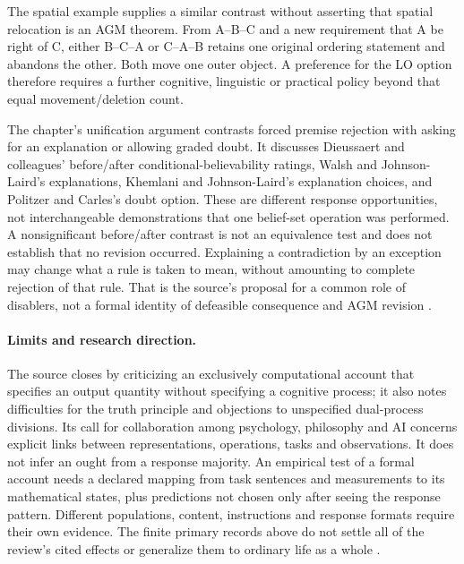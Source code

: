 The spatial example supplies a similar contrast without asserting that
spatial relocation is an AGM theorem. From A--B--C and a new requirement
that A be right of C, either B--C--A or C--A--B retains one original
ordering statement and abandons the other. Both move one outer object.
A preference for the LO option therefore requires a further cognitive,
linguistic or practical policy beyond that equal movement/deletion count.

The chapter's unification argument contrasts forced premise rejection
with asking for an explanation or allowing graded doubt. It discusses
Dieussaert and colleagues' before/after conditional-believability ratings,
Walsh and Johnson-Laird's explanations, Khemlani and Johnson-Laird's
explanation choices, and Politzer and Carles's doubt option. These are
different response opportunities, not interchangeable demonstrations
that one belief-set operation was performed. A nonsignificant before/after
contrast is not an equivalence test and does not establish that no revision
occurred. Explaining a contradiction by an exception may change what a
rule is taken to mean, without amounting to complete rejection of that
rule. That is the source's proposal for a common role of disablers, not
a formal identity of defeasible consequence and AGM revision
\cite[\S5]{GazzoCastanedaKnauff2021Defeasible}.

\paragraph{Limits and research direction.}
The source closes by criticizing an exclusively computational account
that specifies an output quantity without specifying a cognitive process;
it also notes difficulties for the truth principle and objections to
unspecified dual-process divisions. Its call for collaboration among
psychology, philosophy and AI concerns explicit links between representations,
operations, tasks and observations. It does not infer an ought from a
response majority. An empirical test of a formal account needs a declared
mapping from task sentences and measurements to its mathematical states,
plus predictions not chosen only after seeing the response pattern.
Different populations, content, instructions and response formats require
their own evidence. The finite primary records above do not settle all
of the review's cited effects or generalize them to ordinary life as a whole
\cite[\S6]{GazzoCastanedaKnauff2021Defeasible}.
